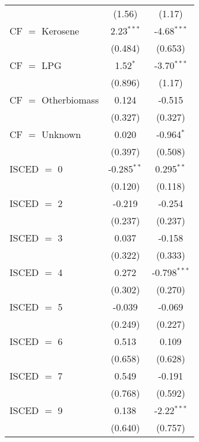 \begin{table}[htbp!]
\begin{adjustbox}{width = 1\textwidth, max height = 0.95\textheight, center}
\begin{threeparttable}[b]
\begin{tabular}{lcc}
                                 & (1.56)         & (1.17)\\   
            CF $=$ Kerosene      & 2.23$^{***}$   & -4.68$^{***}$\\   
                                 & (0.484)        & (0.653)\\   
            CF $=$ LPG           & 1.52$^{*}$     & -3.70$^{***}$\\   
                                 & (0.896)        & (1.17)\\   
            CF $=$ Otherbiomass  & 0.124          & -0.515\\   
                                 & (0.327)        & (0.327)\\   
            CF $=$ Unknown       & 0.020          & -0.964$^{*}$\\   
                                 & (0.397)        & (0.508)\\   
            ISCED $=$ 0          & -0.285$^{**}$  & 0.295$^{**}$\\   
                                 & (0.120)        & (0.118)\\   
            ISCED $=$ 2          & -0.219         & -0.254\\   
                                 & (0.237)        & (0.237)\\   
            ISCED $=$ 3          & 0.037          & -0.158\\   
                                 & (0.322)        & (0.333)\\   
            ISCED $=$ 4          & 0.272          & -0.798$^{***}$\\   
                                 & (0.302)        & (0.270)\\   
            ISCED $=$ 5          & -0.039         & -0.069\\   
                                 & (0.249)        & (0.227)\\   
            ISCED $=$ 6          & 0.513          & 0.109\\   
                                 & (0.658)        & (0.628)\\   
            ISCED $=$ 7          & 0.549          & -0.191\\   
                                 & (0.768)        & (0.592)\\   
            ISCED $=$ 9          & 0.138          & -2.22$^{***}$\\   
                                 & (0.640)        & (0.757)\\   

\end{tabular}
\end{threeparttable}
\end{adjustbox}
\end{table}
